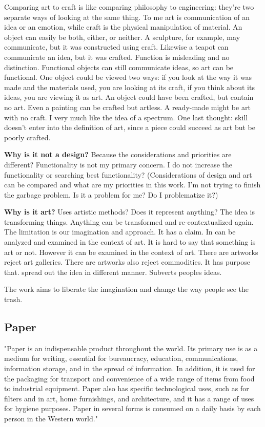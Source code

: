 Comparing art to craft is like comparing philosophy to engineering: they're two separate ways of looking at the same thing. To me art is communication of an idea or an emotion, while craft is the physical manipulation of material. An object can easily be both, either, or neither. A sculpture, for example, may communicate, but it was constructed using craft. Likewise a teapot can communicate an idea, but it was crafted. Function is misleading and no distinction. Functional objects can still communicate ideas, so art can be functional. One object could be viewed two ways: if you look at the way it was made and the materials used, you are looking at its craft, if you think about its ideas, you are viewing it as art. An object could have been crafted, but contain no art. Even a painting can be crafted but artless. A ready-made might be art with no craft. I very much like the idea of a spectrum. One last thought: skill doesn't enter into the definition of art, since a piece could succeed as art but be poorly crafted.

\textbf{Why is it not a design?} Because the considerations and priorities are different? Functionality is not my primary concern. I do not increase the functionality or searching best functionality? (Considerations of design and art can be compared and what are my priorities in this work. I'm not trying to finish the garbage problem. Is it a problem for me? Do I problematize it?) 

\textbf{Why is it art?} Uses artistic methods? Does it represent anything? The idea is transforming things. Anything can be transformed and re-contextualized again. The limitation is our imagination and approach. It has a claim. In can be analyzed and examined in the context of art. It is hard to say that something is art or not. However it can be examined in the context of art. There are artworks reject art galleries. There are artworks also reject commodities. It has purpose that. spread out the idea in different manner. Subverts peoples ideas. 

The work aims to liberate the imagination and change the way people see the trash.

\subsection{Paper}
"Paper is an indispensable product throughout the world. Its primary use is as a medium for writing, essential for bureaucracy, education, communications, information storage, and in the spread of information. In addition, it is used for the packaging for transport and convenience of a wide range of items from food to industrial equipment. Paper also has specific technological uses, such as for filters and in art, home furnishings, and architecture, and it has a range of uses for hygiene purposes. Paper in several forms is consumed on a daily basis by each person in the Western world." \cite{trafford2012paper}

